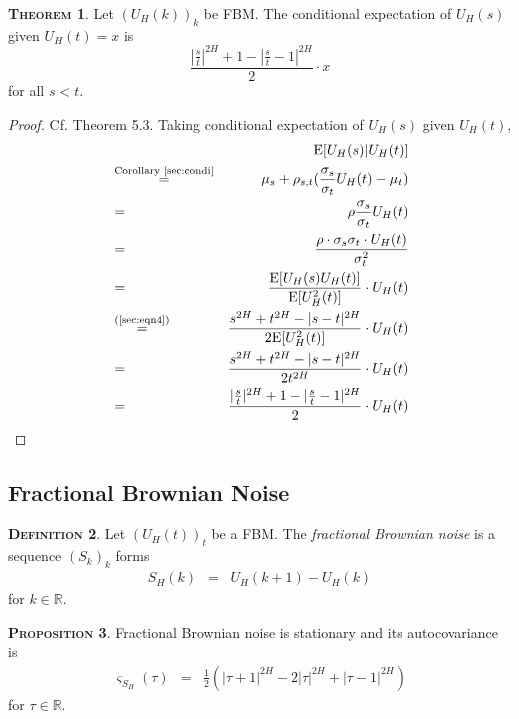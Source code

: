 \documentclass[a4paper, twoside, 11pt]{article}
\theoremstyle{definition}
\newtheorem{definition}{\scshape Definition}[section]
\newtheorem{theorem}[definition]{\scshape Theorem}
\newtheorem{proposition}[definition]{\scshape Proposition}
\begin{document}
\begin{theorem}
  Let $(U_H(k))_{k}$ be FBM. The conditional expectation of $U_H(s)$  given $U_H(t)=x$ is
\begin{equation*}
  \frac{|\frac{s}{t}|^{2H} + 1 - |\frac{s}{t} - 1|^{2H}}{2} \cdot x
\end{equation*}
for all $ s < t$.
\end{theorem}
\begin{proof}
  Cf. \cite{mandelbrot} Theorem 5.3. Taking conditional expectation of $U_H(s)$ given $U_H(t)$,
  \begin{eqnarray*}
  &&\mathrm{E}[U_H(s)|U_H(t)]\\
  &\overset{\text{Corollary \ref{sec:condi}}}{=}& \mu_s + \rho_{s,t} (\frac{\sigma_s}{\sigma_t}U_H(t) - \mu_t)\\
  &=& \rho\frac{\sigma_s}{\sigma_t}U_H(t)\\
  &=& \frac{\rho\cdot\sigma_s\sigma_t\cdot U_H(t)}{\sigma_t^2}\\
  &=& \frac{\mathrm{E}[U_H(s)U_H(t)]}{\mathrm{E}[U_H^2(t)]} \cdot U_H(t)\\
  &\overset{\text{(\ref{sec:eqn4})}}{=}& \frac{s^{2H} + t^{2H} - |s-t|^{2H}}{2\mathrm{E}[U_H^2(t)]}\cdot U_H(t)\\
  &=&  \frac{s^{2H} + t^{2H} - |s-t|^{2H}}{2t^{2H}}\cdot U_H(t)\\
  &=& \frac{|\frac{s}{t}|^{2H} + 1 - |\frac{s}{t} - 1|^{2H}}{2} \cdot U_H(t)
  \end{eqnarray*}
\end{proof}

\subsection{Fractional Brownian Noise}
\begin{definition}
  Let $(U_H(t))_t$ be a FBM. The \emph{fractional Brownian noise} is a sequence $(S_k)_k$ forms
\begin{eqnarray*}
  S_H(k) &=& U_H(k+1) - U_H(k)
\end{eqnarray*}
for $k \in \mathbb{R}$.
\end{definition}

\begin{proposition}
  Fractional Brownian noise is stationary and its autocovariance is 
  \begin{eqnarray}
	\varsigma_{S_H}(\tau) &=&  \frac{1}{2} (|\tau + 1|^{2H} - 2|\tau|^{2H} + |\tau-1|^{2H})
  \label{sec:auto}
  \end{eqnarray}
  for $\tau \in \mathbb{R}$.
\end{proposition}
\end{document}
